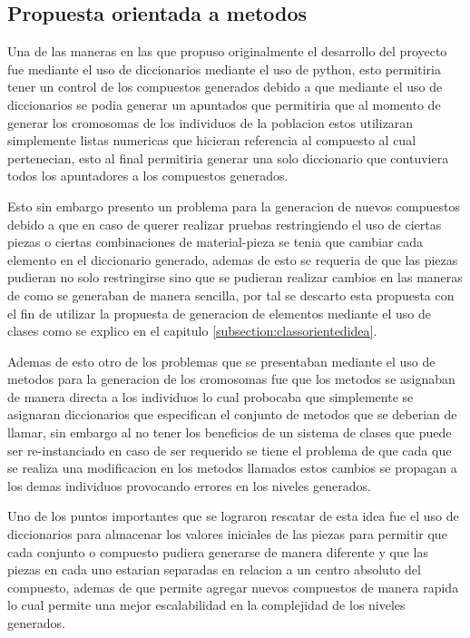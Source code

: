 \subsection{Propuesta orientada a metodos}
\label{subsection:objectorientedidea}

Una de las maneras en las que propuso originalmente el desarrollo del proyecto
fue mediante el uso de diccionarios mediante el uso de python, esto permitiria
tener un control de los compuestos generados debido a que mediante el uso de
diccionarios se podia generar un apuntados que permitiria que al momento de
generar los cromosomas de los individuos de la poblacion estos utilizaran
simplemente listas numericas que hicieran referencia al compuesto al cual
pertenecian, esto al final permitiria generar una solo diccionario que
contuviera todos los apuntadores a los compuestos generados.

Esto sin embargo presento un problema para la generacion de nuevos compuestos
debido a que en caso de querer realizar pruebas restringiendo el uso de ciertas
piezas o ciertas combinaciones de material-pieza se tenia que cambiar cada
elemento en el diccionario generado, ademas de esto se requeria de que las
piezas pudieran no solo restringirse sino que se pudieran realizar cambios en
las maneras de como se generaban de manera sencilla, por tal se descarto esta
propuesta con el fin de utilizar la propuesta de generacion de elementos
mediante el uso de clases como se explico en el capitulo
\ref{subsection:classorientedidea}.

Ademas de esto otro de los problemas que se presentaban mediante el uso de
metodos para la generacion de los cromosomas fue que los metodos se asignaban de
manera directa a los individuos lo cual probocaba que simplemente se asignaran
diccionarios que especifican el conjunto de metodos que se deberian de llamar,
sin embargo al no tener los beneficios de un sistema de clases que puede ser
re-instanciado en caso de ser requerido se tiene el problema de que cada que se
realiza una modificacion en los metodos llamados estos cambios se propagan a los
demas individuos provocando errores en los niveles generados.

Uno de los puntos importantes que se lograron rescatar de esta idea fue el uso
de diccionarios para almacenar los valores iniciales de las piezas para permitir
que cada conjunto o compuesto pudiera generarse de manera diferente y que las
piezas en cada uno estarian separadas en relacion a un centro absoluto del
compuesto, ademas de que permite agregar nuevos compuestos de manera rapida lo
cual permite una mejor escalabilidad en la complejidad de los niveles generados.

